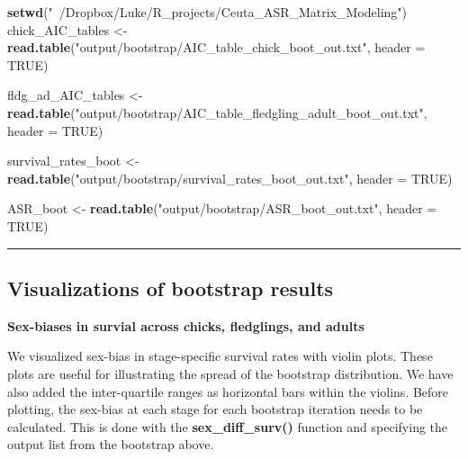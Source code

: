 \documentclass[]{article}
\newenvironment{Shaded}{\begin{snugshade}}{\end{snugshade}}
\newcommand{\KeywordTok}[1]{\textcolor[rgb]{0.13,0.29,0.53}{\textbf{{#1}}}}
\newcommand{\DataTypeTok}[1]{\textcolor[rgb]{0.13,0.29,0.53}{{#1}}}
\newcommand{\StringTok}[1]{\textcolor[rgb]{0.31,0.60,0.02}{{#1}}}
\newcommand{\OtherTok}[1]{\textcolor[rgb]{0.56,0.35,0.01}{{#1}}}
\newcommand{\NormalTok}[1]{{#1}}
\begin{document}
\begin{Shaded}
\begin{Highlighting}[]
\KeywordTok{setwd}\NormalTok{(}\StringTok{"~/Dropbox/Luke/R_projects/Ceuta_ASR_Matrix_Modeling"}\NormalTok{)}
\NormalTok{chick_AIC_tables <-}\StringTok{ }
\StringTok{  }\KeywordTok{read.table}\NormalTok{(}\StringTok{"output/bootstrap/AIC_table_chick_boot_out.txt"}\NormalTok{, }\DataTypeTok{header =} \OtherTok{TRUE}\NormalTok{)}

\NormalTok{fldg_ad_AIC_tables <-}\StringTok{ }
\StringTok{  }\KeywordTok{read.table}\NormalTok{(}\StringTok{"output/bootstrap/AIC_table_fledgling_adult_boot_out.txt"}\NormalTok{, }\DataTypeTok{header =} \OtherTok{TRUE}\NormalTok{)}

\NormalTok{survival_rates_boot <-}\StringTok{ }
\StringTok{  }\KeywordTok{read.table}\NormalTok{(}\StringTok{"output/bootstrap/survival_rates_boot_out.txt"}\NormalTok{, }\DataTypeTok{header =} \OtherTok{TRUE}\NormalTok{)}

\NormalTok{ASR_boot <-}\StringTok{ }
\StringTok{  }\KeywordTok{read.table}\NormalTok{(}\StringTok{"output/bootstrap/ASR_boot_out.txt"}\NormalTok{, }\DataTypeTok{header =} \OtherTok{TRUE}\NormalTok{)}
\end{Highlighting}
\end{Shaded}

\begin{center}\rule{0.5\linewidth}{\linethickness}\end{center}

\subsection{Visualizations of bootstrap
results}\label{visualizations-of-bootstrap-results}

\textbf{Sex-biases in survial across chicks, fledglings, and adults}

We visualized sex-bias in stage-specific survival rates with violin
plots. These plots are useful for illustrating the spread of the
bootstrap distribution. We have also added the inter-quartile ranges as
horizontal bars within the violins. Before plotting, the sex-bias at
each stage for each bootstrap iteration needs to be calculated. This is
done with the \textbf{sex\_diff\_surv()} function and specifying the
output list from the bootstrap above.
\end{document}
